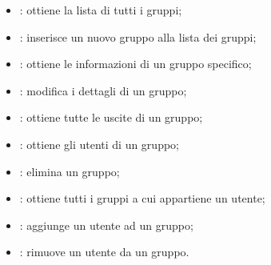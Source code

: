 \begin{itemize}
    \item {}: ottiene la lista di tutti i gruppi;
    \item {}: inserisce un nuovo gruppo alla lista dei gruppi;
    \item {}: ottiene le informazioni di un gruppo specifico;
    \item {}: modifica i dettagli di un gruppo;
    \item {}: ottiene tutte le uscite di un gruppo;
    \item {}: ottiene gli utenti di un gruppo;
    \item {}: elimina un gruppo;
    \item {}: ottiene tutti i gruppi a cui appartiene un
          utente;
    \item {}: aggiunge un utente ad un gruppo;
    \item {}: rimuove un utente da un gruppo.
\end{itemize}